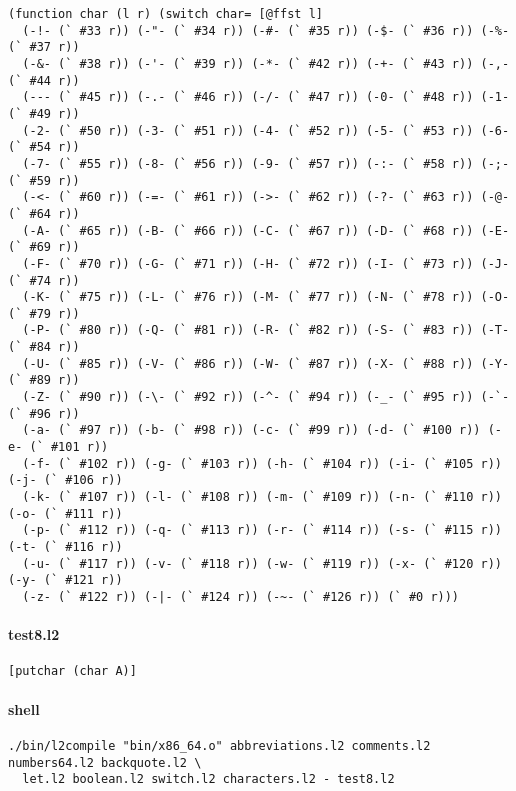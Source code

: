 \documentclass[]{article}
\let\oldparagraph\paragraph
\renewcommand{\paragraph}[1]{\oldparagraph{#1}\mbox{}}
\begin{document}
\begin{verbatim}
(function char (l r) (switch char= [@ffst l]
  (-!- (` #33 r)) (-"- (` #34 r)) (-#- (` #35 r)) (-$- (` #36 r)) (-%- (` #37 r))
  (-&- (` #38 r)) (-'- (` #39 r)) (-*- (` #42 r)) (-+- (` #43 r)) (-,- (` #44 r))
  (--- (` #45 r)) (-.- (` #46 r)) (-/- (` #47 r)) (-0- (` #48 r)) (-1- (` #49 r))
  (-2- (` #50 r)) (-3- (` #51 r)) (-4- (` #52 r)) (-5- (` #53 r)) (-6- (` #54 r))
  (-7- (` #55 r)) (-8- (` #56 r)) (-9- (` #57 r)) (-:- (` #58 r)) (-;- (` #59 r))
  (-<- (` #60 r)) (-=- (` #61 r)) (->- (` #62 r)) (-?- (` #63 r)) (-@- (` #64 r))
  (-A- (` #65 r)) (-B- (` #66 r)) (-C- (` #67 r)) (-D- (` #68 r)) (-E- (` #69 r))
  (-F- (` #70 r)) (-G- (` #71 r)) (-H- (` #72 r)) (-I- (` #73 r)) (-J- (` #74 r))
  (-K- (` #75 r)) (-L- (` #76 r)) (-M- (` #77 r)) (-N- (` #78 r)) (-O- (` #79 r))
  (-P- (` #80 r)) (-Q- (` #81 r)) (-R- (` #82 r)) (-S- (` #83 r)) (-T- (` #84 r))
  (-U- (` #85 r)) (-V- (` #86 r)) (-W- (` #87 r)) (-X- (` #88 r)) (-Y- (` #89 r))
  (-Z- (` #90 r)) (-\- (` #92 r)) (-^- (` #94 r)) (-_- (` #95 r)) (-`- (` #96 r))
  (-a- (` #97 r)) (-b- (` #98 r)) (-c- (` #99 r)) (-d- (` #100 r)) (-e- (` #101 r))
  (-f- (` #102 r)) (-g- (` #103 r)) (-h- (` #104 r)) (-i- (` #105 r)) (-j- (` #106 r))
  (-k- (` #107 r)) (-l- (` #108 r)) (-m- (` #109 r)) (-n- (` #110 r)) (-o- (` #111 r))
  (-p- (` #112 r)) (-q- (` #113 r)) (-r- (` #114 r)) (-s- (` #115 r)) (-t- (` #116 r))
  (-u- (` #117 r)) (-v- (` #118 r)) (-w- (` #119 r)) (-x- (` #120 r)) (-y- (` #121 r))
  (-z- (` #122 r)) (-|- (` #124 r)) (-~- (` #126 r)) (` #0 r)))
\end{verbatim}

\paragraph{test8.l2}\label{test8.l2}

\begin{verbatim}
[putchar (char A)]
\end{verbatim}

\paragraph{shell}\label{shell-7}

\begin{verbatim}
./bin/l2compile "bin/x86_64.o" abbreviations.l2 comments.l2 numbers64.l2 backquote.l2 \
  let.l2 boolean.l2 switch.l2 characters.l2 - test8.l2
\end{verbatim}
\end{document}
